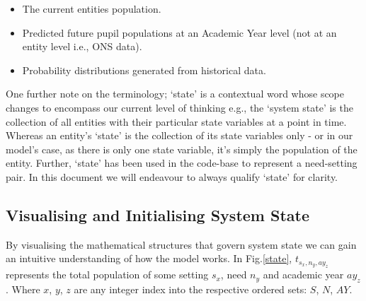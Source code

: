\documentclass[margin=5mm]{article}
\begin{document}
\begin{itemize}
\item The current entities population.
\item Predicted future pupil populations at an Academic Year level (not at
  an entity level i.e., ONS data).
\item Probability distributions generated from historical data.
\end{itemize}

One further note on the terminology; `state' is a contextual word
whose scope changes to encompass our current level of thinking e.g.,
the `system state' is the collection of all entities with their
particular state variables at a point in time.  Whereas an entity's
`state' is the collection of its state variables only - or in our
model's case, as there is only one state variable, it's simply the
population of the entity.  Further, `state' has been used in the
code-base to represent a need-setting pair.  In this document we will
endeavour to always qualify `state' for clarity.

\subsection{Visualising and Initialising System State}
By visualising the mathematical structures that govern system state we
can gain an intuitive understanding of how the model works.  In
Fig.\ref{state}, $t_{s_x,n_y,ay_z}$ represents the total population of
some setting $s_x$, need $n_y$ and academic year $ay_z$.  Where $x$,
$y$, $z$ are any integer index into the respective ordered sets: $S$,
$N$, $AY$.
\end{document}
